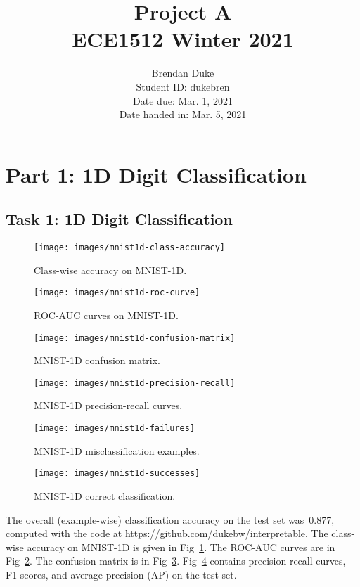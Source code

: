\documentclass{article}
\title{Project A \\ECE1512 Winter 2021}
\author{Brendan Duke\\Student ID: dukebren\\Date due: Mar. 1, 2021\\Date handed in: Mar. 5, 2021}
\date{}
\begin{document}
\maketitle
\clearpage


\section{Part 1: 1D Digit Classification}


\subsection{Task 1: 1D Digit Classification}

\begin{figure}[t]
	\texttt{[image: images/mnist1d-class-accuracy]}
	\caption{\label{fig:mnist1d-classwise-accuracy}Class-wise accuracy on MNIST-1D\@.}
\end{figure}

\begin{figure}[t]
	\texttt{[image: images/mnist1d-roc-curve]}
	\caption{\label{fig:mnist1d-roc-curve}ROC-AUC curves on MNIST-1D\@.}
\end{figure}

\begin{figure}[t]
	\texttt{[image: images/mnist1d-confusion-matrix]}
	\caption{\label{fig:mnist1d-confusion-matrix}MNIST-1D confusion matrix.}
\end{figure}

\begin{figure}[t]
	\texttt{[image: images/mnist1d-precision-recall]}
	\caption{\label{fig:mnist1d-precision-recall}MNIST-1D precision-recall curves.}
\end{figure}

\begin{figure}[t]
	\texttt{[image: images/mnist1d-failures]}
	\caption{\label{fig:mnist1d-failures}MNIST-1D misclassification examples.}
\end{figure}

\begin{figure}[t]
	\texttt{[image: images/mnist1d-successes]}
	\caption{\label{fig:mnist1d-successes}MNIST-1D correct classification.}
\end{figure}

The overall (example-wise) classification accuracy on the test set was~\num{0.877}, computed with the code at \url{https://github.com/dukebw/interpretable}.
The class-wise accuracy on MNIST-1D is given in Fig~\ref{fig:mnist1d-classwise-accuracy}.
The ROC-AUC curves are in Fig~\ref{fig:mnist1d-roc-curve}.
The confusion matrix is in Fig~\ref{fig:mnist1d-confusion-matrix}.
Fig~\ref{fig:mnist1d-precision-recall} contains precision-recall curves, F1 scores, and average precision (AP) on the test set.
\end{document}
